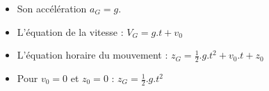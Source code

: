 \documentclass[12pt]{article}
\begin{document}
\begin{itemize}
	\item Son accélération $a_G = g$.
	\item L'équation de la vitesse : $V_G = g.t+v_0$
	\item L'équation horaire du mouvement : $z_G = \frac{1}{2}.g.t^2 + v_0.t + z_0$ 
	\item Pour $v_0 = 0$ et $z_0 = 0$ : $z_G = \frac{1}{2}.g.t^2$ 
\end{itemize}

\end{document}
